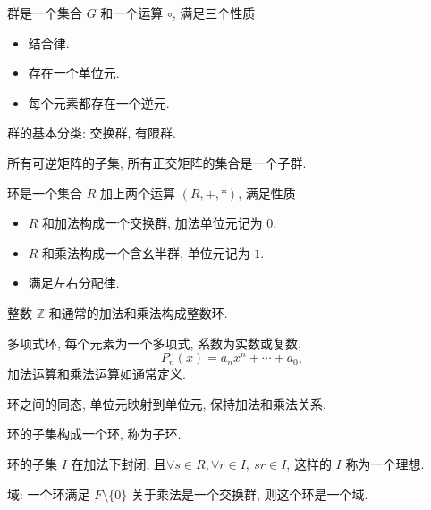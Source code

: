 
\begin{definition}
  群是一个集合 $G$ 和一个运算 $\circ$, 满足三个性质
  \begin{itemize}
    \item 结合律.
    \item 存在一个单位元. 
    \item 每个元素都存在一个逆元.
  \end{itemize}
\end{definition}

群的基本分类:
交换群, 有限群.

\begin{example}
  所有可逆矩阵的子集, 所有正交矩阵的集合是一个子群.
\end{example}

\begin{definition}
  环是一个集合 $R$ 加上两个运算 $(R, +, *)$, 满足性质
  \begin{itemize}
    \item $R$ 和加法构成一个交换群, 加法单位元记为 $0$.
    \item $R$ 和乘法构成一个含幺半群, 单位元记为 $1$.
    \item 满足左右分配律.
  \end{itemize}
\end{definition}

\begin{example}
  整数 $\mathbb{Z}$ 和通常的加法和乘法构成整数环.
\end{example}
\begin{example}
  多项式环, 每个元素为一个多项式, 系数为实数或复数,
  \begin{equation}
    P_n (x) = a_n x^{n} + \cdots + a_0,
  \end{equation}
  加法运算和乘法运算如通常定义.
\end{example}

\begin{definition}
  环之间的同态, 单位元映射到单位元, 保持加法和乘法关系.
\end{definition}

\begin{definition}
  环的子集构成一个环, 称为子环. 

  环的子集 $I$ 在加法下封闭, 且$\forall s \in R, \forall r \in I, \ sr \in I$, 这样的 $I$ 称为一个理想.
\end{definition}

\begin{definition}
  域: 一个环满足 $F \setminus \{ 0 \}$ 关于乘法是一个交换群, 则这个环是一个域.
\end{definition}
